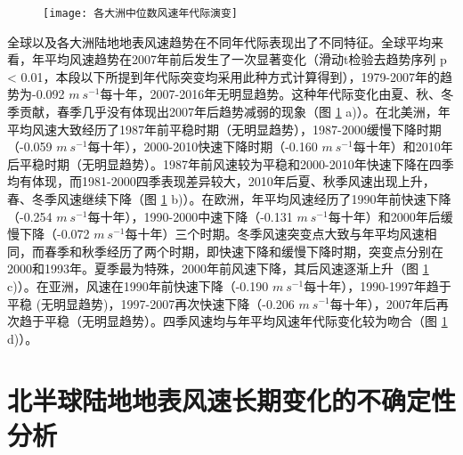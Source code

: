 \begin{figure}[!b]
    \centering
    \texttt{[image: 各大洲中位数风速年代际演变]}
    \label{fig:regionalmedianwinddecadalchange}
\end{figure}

全球以及各大洲陆地地表风速趋势在不同年代际表现出了不同特征。全球平均来看，年平均风速趋势在2007年前后发生了一次显著变化（滑动t检验去趋势序列 p < 0.01，本段以下所提到年代际突变均采用此种方式计算得到），1979-2007年的趋势为-0.092 $m ~ s^{-1}$每十年，2007-2016年无明显趋势。这种年代际变化由夏、秋、冬季贡献，春季几乎没有体现出2007年后趋势减弱的现象（图 \ref{fig:regionalmedianwinddecadalchange} a)）。在北美洲，年平均风速大致经历了1987年前平稳时期（无明显趋势），1987-2000缓慢下降时期（-0.059 $m ~ s^{-1}$每十年），2000-2010快速下降时期（-0.160 $m ~ s^{-1}$每十年）和2010年后平稳时期（无明显趋势）。1987年前风速较为平稳和2000-2010年快速下降在四季均有体现，而1981-2000四季表现差异较大，2010年后夏、秋季风速出现上升，春、冬季风速继续下降（图 \ref{fig:regionalmedianwinddecadalchange} b)）。在欧洲，年平均风速经历了1990年前快速下降（-0.254 $m ~ s^{-1}$每十年），1990-2000中速下降（-0.131 $m ~ s^{-1}$每十年）和2000年后缓慢下降（-0.072 $m ~ s^{-1}$每十年）三个时期。冬季风速突变点大致与年平均风速相同，而春季和秋季经历了两个时期，即快速下降和缓慢下降时期，突变点分别在2000和1993年。夏季最为特殊，2000年前风速下降，其后风速逐渐上升（图 \ref{fig:regionalmedianwinddecadalchange} c)）。在亚洲，风速在1990年前快速下降（-0.190 $m ~ s^{-1}$每十年），1990-1997年趋于平稳 (无明显趋势)，1997-2007再次快速下降（-0.206 $m ~ s^{-1}$每十年），2007年后再次趋于平稳（无明显趋势）。四季风速均与年平均风速年代际变化较为吻合（图 \ref{fig:regionalmedianwinddecadalchange} d)）。

\section{北半球陆地地表风速长期变化的不确定性分析}

